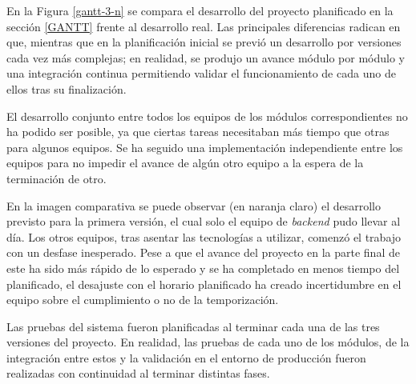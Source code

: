 \documentclass{article}
\begin{document}
En la Figura \ref{gantt-3-n} se compara el desarrollo del proyecto planificado en la sección \ref{GANTT} frente al desarrollo real. Las principales diferencias radican en que, mientras que en la planificación inicial se previó un desarrollo por versiones cada vez más complejas; en realidad, se produjo un avance módulo por módulo y una integración continua permitiendo validar el funcionamiento de cada uno de ellos tras su finalización.

El desarrollo conjunto entre todos los equipos de los módulos correspondientes no ha podido ser posible, ya que ciertas tareas necesitaban más tiempo que otras para algunos equipos. Se ha seguido una implementación independiente entre los equipos para no impedir el avance de algún otro equipo a la espera de la terminación de otro.

En la imagen comparativa se puede observar (en naranja claro) el desarrollo previsto para la primera versión, el cual solo el equipo de \textit{backend} pudo llevar al día. Los otros equipos, tras asentar las tecnologías a utilizar, comenzó el trabajo con un desfase inesperado. Pese a que el avance del proyecto en la parte final de este ha sido más rápido de lo esperado y se ha completado en menos tiempo del planificado, el desajuste con el horario planificado ha creado incertidumbre en el equipo sobre el cumplimiento o no de la temporización.

Las pruebas del sistema fueron planificadas al terminar cada una de las tres versiones del proyecto. En realidad, las pruebas de cada uno de los módulos, de la integración entre estos y la validación en el entorno de producción fueron realizadas con continuidad al terminar distintas fases.
\end{document}
